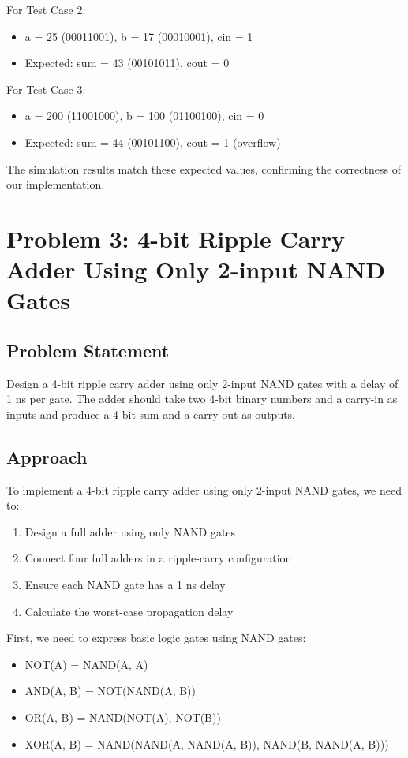 \documentclass{article}
\begin{document}
For Test Case 2:
\begin{itemize}
	\item a = 25 (00011001), b = 17 (00010001), cin = 1
	\item Expected: sum = 43 (00101011), cout = 0
\end{itemize}

For Test Case 3:
\begin{itemize}
	\item a = 200 (11001000), b = 100 (01100100), cin = 0
	\item Expected: sum = 44 (00101100), cout = 1 (overflow)
\end{itemize}

The simulation results match these expected values, confirming the correctness of our implementation.

\section{Problem 3: 4-bit Ripple Carry Adder Using Only 2-input NAND Gates}

\subsection{Problem Statement}
Design a 4-bit ripple carry adder using only 2-input NAND gates with a delay of 1 ns per gate. The adder should take two 4-bit binary numbers and a carry-in as inputs and produce a 4-bit sum and a carry-out as outputs.

\subsection{Approach}
To implement a 4-bit ripple carry adder using only 2-input NAND gates, we need to:

\begin{enumerate}
	\item Design a full adder using only NAND gates
	\item Connect four full adders in a ripple-carry configuration
	\item Ensure each NAND gate has a 1 ns delay
	\item Calculate the worst-case propagation delay
\end{enumerate}

First, we need to express basic logic gates using NAND gates:
\begin{itemize}
	\item NOT(A) = NAND(A, A)
	\item AND(A, B) = NOT(NAND(A, B))
	\item OR(A, B) = NAND(NOT(A), NOT(B))
	\item XOR(A, B) = NAND(NAND(A, NAND(A, B)), NAND(B, NAND(A, B)))
\end{itemize}
\end{document}
